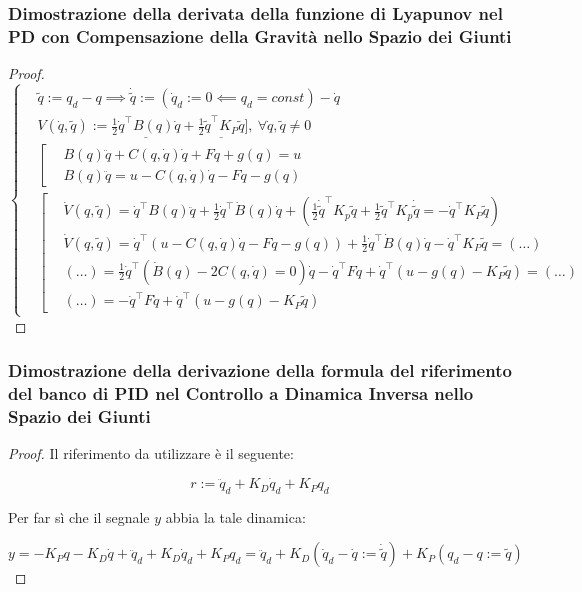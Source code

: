 \subsubsection{Dimostrazione della derivata della funzione di Lyapunov nel PD con Compensazione della Gravità nello Spazio dei Giunti}

\begin{proof}

\[
	\left\{
	\begin{aligned}
	&\tilde{q} := q_d-q \implies \dot{\tilde{q}} := (\dot{q}_d := 0 \impliedby q_d=const) - \dot{q}\\
	&V(\dot{q},\tilde{q}) := \underline{\frac{1}{2}\dot{q}^\top B(q)\dot{q}} + \underline{\frac{1}{2}\tilde{q}^\top K_P\tilde{q}}],\ \forall \dot{q},\tilde{q}\neq 0\\
	&\left[
	\begin{aligned}
	&B(q)\ddot{q} + C(q,\dot{q})\dot{q} + F\dot{q} + g(q) = u\\
	&B(q)\ddot{q} = u - C(q,\dot{q})\dot{q} - F\dot{q} - g(q)
	\end{aligned}
	\right.\\
	&\left[
	\begin{aligned}
	&\dot{V}(q,\tilde{q}) = \dot{q}^\top B(q)\ddot{q} + \frac{1}{2}\dot{q}^\top\dot{B}(q)\dot{q} + (\frac{1}{2}\dot{\tilde{q}}^\top K_p\tilde{q} + \frac{1}{2}\tilde{q}^\top K_p\dot{\tilde{q}} = -\dot{q}^\top K_P\tilde{q})\\
	&\dot{V}(q,\tilde{q}) = \dot{q}^\top(u - C(q,\dot{q})\dot{q} - F\dot{q} - g(q)) + \frac{1}{2}\dot{q}^\top\dot{B}(q)\dot{q} -\dot{q}^\top K_P\tilde{q} = (\dots)\\
	&(\dots) = \frac{1}{2}\dot{q}^\top(\dot{B}(q) - 2C(q,\dot{q}) = 0)\dot{q} - \dot{q}^\top F\dot{q} + \dot{q}^\top(u - g(q) - K_P\tilde{q}) = (\dots)\\
	&(\dots) = - \dot{q}^\top F\dot{q} + \dot{q}^\top(u - g(q) - K_P\tilde{q})
	\end{aligned}
	\right.
	\end{aligned}
	\right.
\]

\end{proof}

\subsubsection{Dimostrazione della derivazione della formula del riferimento del banco di PID nel Controllo a Dinamica Inversa nello Spazio dei Giunti}

\begin{proof}

Il riferimento da utilizzare è il seguente:

\[
	r := \ddot{q}_d + K_D\dot{q}_d + K_Pq_d
\]

Per far sì che il segnale $y$ abbia la tale dinamica:

\[
	y = -K_Pq - K_D\dot{q} + \ddot{q}_d + K_D\dot{q}_d + K_Pq_d = \ddot{q}_d + K_D(\dot{q}_d - \dot{q} := \dot{\tilde{q}}) + K_P(q_d - q := \tilde{q})
\]
 
\end{proof}

